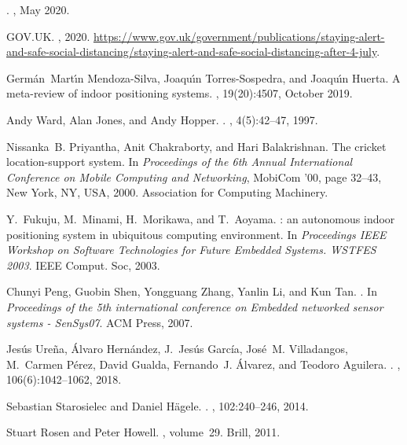 \documentclass{article}
\begin{document}
\begin{thebibliography}{10}

.
, May 2020.

GOV.UK.
, 2020.
\newblock \url{https://www.gov.uk/government/publications/staying-alert-and-safe-social-distancing/staying-alert-and-safe-social-distancing-after-4-july}.

Germ{\'{a}}n~Mart{\'{\i}}n Mendoza-Silva, Joaqu{\'{\i}}n Torres-Sospedra, and
  Joaqu{\'{\i}}n Huerta.
\newblock A meta-review of indoor positioning systems.
, 19(20):4507, October 2019.

Andy Ward, Alan Jones, and Andy Hopper.
.
, 4(5):42--47, 1997.

Nissanka~B. Priyantha, Anit Chakraborty, and Hari Balakrishnan.
\newblock The cricket location-support system.
\newblock In {\em Proceedings of the 6th Annual International Conference on
  Mobile Computing and Networking}, MobiCom '00, page 32–43, New York, NY,
  USA, 2000. Association for Computing Machinery.

Y.~Fukuju, M.~Minami, H.~Morikawa, and T.~Aoyama.
: an autonomous indoor positioning system in ubiquitous
  computing environment.
\newblock In {\em Proceedings {IEEE} Workshop on Software Technologies for
  Future Embedded Systems. {WSTFES} 2003}. {IEEE} Comput. Soc, 2003.

Chunyi Peng, Guobin Shen, Yongguang Zhang, Yanlin Li, and Kun Tan.
.
\newblock In {\em Proceedings of the 5th international conference on Embedded
  networked sensor systems - {SenSys07}}. {ACM} Press, 2007.

Jes{\'{u}}s Ure{\~{n}}a, {\'{A}}lvaro Hern{\'{a}}ndez, J.~Jes{\'{u}}s
  Garc{\'{i}}a, Jos{\'{e}}~M. Villadangos, M.~Carmen P{\'{e}}rez, David Gualda,
  Fernando~J. {\'{A}}lvarez, and Teodoro Aguilera.
.
, 106(6):1042--1062, 2018.

Sebastian Starosielec and Daniel H{\"{a}}gele.
.
, 102:240--246, 2014.

Stuart Rosen and Peter Howell.
, volume~29.
\newblock Brill, 2011.

\end{thebibliography}
\end{document}
